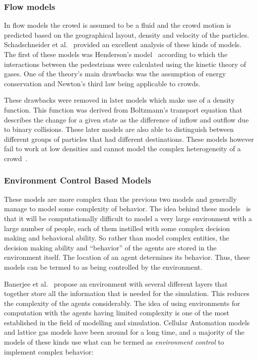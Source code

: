 \subsubsection{Flow models}

In flow models the crowd is assumed to be a fluid and the crowd motion is predicted based on the geographical layout, density and velocity of the particles. Schadschneider et al.~\cite{Schadschneider:2008cz} provided an excellent analysis of these kinds of models. The first of these models was Henderson's model~\cite{Henderson:1974ve} according to which the interactions between the pedestrians were calculated using the kinetic theory of gases. One of the theory's main drawbacks was the assumption of energy conservation and Newton's third law being applicable to crowds.

These drawbacks were removed in later models which make use of a density function. This function was derived from Boltzmann's transport equation that describes the change for a given state as the difference of inflow and outflow due to binary collisions. These later models are also able to distinguish between different groups of particles that had different destinations. These models however fail to work at low densities and cannot model the complex heterogeneity of a crowd~\cite{Bierlaire:2003uj}.


\subsubsection{Environment Control Based Models}
\label{sec:EnvironmentControlBasedModels}

These models are more complex than the previous two models and generally manage to model some complexity of behavior. The idea behind these models~\cite{Banerjee:2008jh} is that it will be computationally difficult to model a very large environment with a large number of people, each of them instilled with some complex decision making and behavioral ability. So rather than model complex entities, the decision making ability and ``behavior'' of the agents are stored in the environment itself. The location of an agent determines its behavior. Thus, these models can be termed to as being controlled by the environment.

Banerjee et al.~\cite{Banerjee:2008jh,Banerjee:2009jo} propose an environment with several different layers that together store all the information that is needed for the simulation. This reduces the complexity of the agents considerably. The idea of using environments for computation with the agents having limited complexity is one of the most established in the field of modelling and simulation. Cellular Automation models and lattice gas models have been around for a long time, and a majority of the models of these kinds use what can be termed as \emph{environment control} to implement complex behavior:

